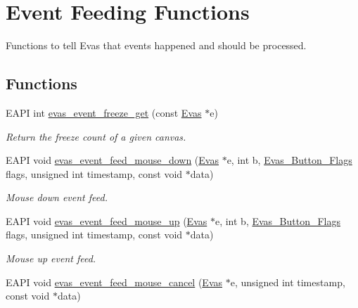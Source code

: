 \section{Event Feeding Functions}
\label{group__Evas__Event__Feeding__Group}


Functions to tell Evas that events happened and should be processed.  


\subsection*{Functions}
\begin{DoxyCompactItemize}
\item 
EAPI int \hyperlink{group__Evas__Event__Feeding__Group_gabc15f5115b4baaeafd2d144f307b6b64}{evas\_\-event\_\-freeze\_\-get} (const \hyperlink{group__Evas__Canvas_ga5ff87cc4ce6bc43e3b640a6d37f73043}{Evas} $\ast$e)
\begin{DoxyCompactList}\small\item\em Return the freeze count of a given canvas. \item\end{DoxyCompactList}\item 
EAPI void \hyperlink{group__Evas__Event__Feeding__Group_ga5c9811b87406a96ff573b83d1efd52f2}{evas\_\-event\_\-feed\_\-mouse\_\-down} (\hyperlink{group__Evas__Canvas_ga5ff87cc4ce6bc43e3b640a6d37f73043}{Evas} $\ast$e, int b, \hyperlink{Evas_8h_aae3a7dde94160cc18015784fb192bb2f}{Evas\_\-Button\_\-Flags} flags, unsigned int timestamp, const void $\ast$data)
\begin{DoxyCompactList}\small\item\em Mouse down event feed. \item\end{DoxyCompactList}\item 
EAPI void \hyperlink{group__Evas__Event__Feeding__Group_gacb400569d04ecfd2b89eb0f39856581c}{evas\_\-event\_\-feed\_\-mouse\_\-up} (\hyperlink{group__Evas__Canvas_ga5ff87cc4ce6bc43e3b640a6d37f73043}{Evas} $\ast$e, int b, \hyperlink{Evas_8h_aae3a7dde94160cc18015784fb192bb2f}{Evas\_\-Button\_\-Flags} flags, unsigned int timestamp, const void $\ast$data)
\begin{DoxyCompactList}\small\item\em Mouse up event feed. \item\end{DoxyCompactList}\item 
EAPI void \hyperlink{group__Evas__Event__Feeding__Group_ga5c300cdca8551fd49d5341ef19c8f385}{evas\_\-event\_\-feed\_\-mouse\_\-cancel} (\hyperlink{group__Evas__Canvas_ga5ff87cc4ce6bc43e3b640a6d37f73043}{Evas} $\ast$e, unsigned int timestamp, const void $\ast$data)

\end{DoxyCompactItemize}
